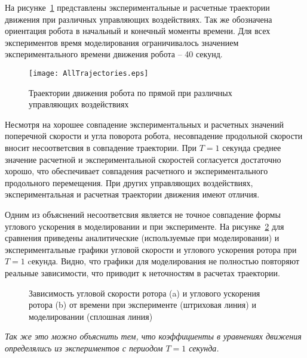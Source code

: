 На рисунке~\ref{AllTrajectories} представлены экспериментальные и расчетные траектории движения при различных управляющих воздействиях. Так же обозначена ориентация робота в начальный и конечный моменты времени. Для всех экспериментов время моделирования ограничивалось значением экспериментального времени движения робота -- 40 секунд.

\begin{figure}[!ht]
	\centering
	\texttt{[image: AllTrajectories.eps]}
	\caption{Траектории движения робота по прямой при различных управляющих воздействиях}
	\label{AllTrajectories}
\end{figure}

Несмотря на хорошее совпадение экспериментальных и расчетных значений поперечной скорости и угла поворота робота, несовпадение продольной скорости вносит несоответсвия в совпадение траектории. При $ T = 1 $ секунда среднее значение расчетной и экспериментальной скоростей согласуется достаточно хорошо, что обеспечивает совпадения расчетного и экспериментального продольного перемещения. При других управляющих воздействиях, экспериментальная и расчетная траектории движения имеют отличия.

Одним из объяснений несоответсвия является не точное совпадение формы углового ускорения в моделировании и при эксперименте.	На рисунке~\ref{OmegaT1EpsilonT1} для сравнения приведены аналитические (используемые при моделировании) и экспериментальные графики угловой скорости и углового ускорения ротора  при $ T = 1 $ cекунда. Видно, что графики для моделирования не полностью повторяют реальные зависимости, что приводит к неточностям в расчетах траектории.

\begin{figure}[!ht]
	\begin{minipage}[h]{0.5\linewidth}
	\end{minipage}
	\hfill
	\begin{minipage}[h]{0.5\linewidth}
	\end{minipage}
	\caption{Зависимость угловой скорости ротора (a) и углового ускорения ротора (b) от времени при эксперименте (штриховая линия) и моделировании (сплошная линия)}
	\label{OmegaT1EpsilonT1}
\end{figure}

\textit{Так же это можно объяснить тем, что коэффициенты в уравнениях движения определялись из экспериментов с периодом $ T = 1 $ секунда.}

